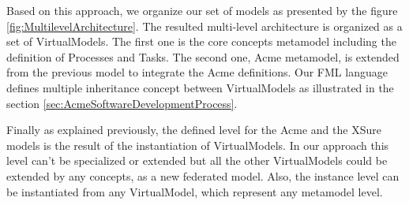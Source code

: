 Based on this approach, we organize our set of models as presented by the figure \ref{fig:MultilevelArchitecture}. The resulted multi-level architecture is organized as a set of VirtualModels. The first one is the core concepts metamodel including the definition of Processes and Tasks. The second one, Acme metamodel, is extended from the previous model to integrate the Acme definitions. Our FML language defines multiple inheritance concept between VirtualModels as illustrated in the section \ref{sec:AcmeSoftwareDevelopmentProcess}.

Finally as explained previously, the defined level for the Acme  and the XSure models is the result of the instantiation of VirtualModels. In our approach this level can't be specialized or extended but all the other VirtualModels could be extended  by any concepts, as a new federated model. 
Also, the instance level can be instantiated from any VirtualModel, which represent any metamodel level. 






~\\
~\\



